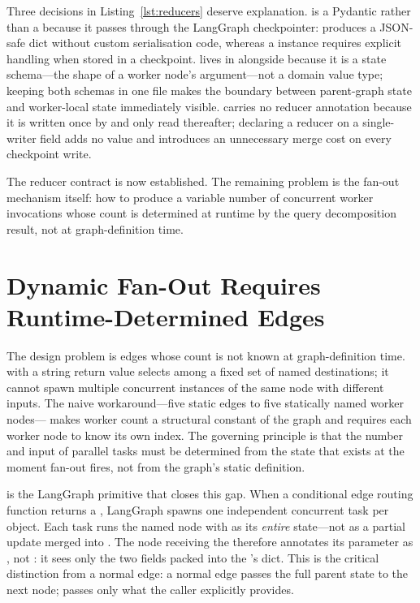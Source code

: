 Three decisions in Listing~\ref{lst:reducers} deserve explanation.
 is a Pydantic  rather than a
 because it passes through the LangGraph checkpointer:
 produces a JSON-safe dict without custom
serialisation code, whereas a  instance requires explicit
handling when stored in a checkpoint.  lives in
 alongside  because it is a state
schema---the shape of a worker node's  argument---not a
domain value type; keeping both schemas in one file makes the boundary
between parent-graph state and worker-local state immediately visible.
 carries no reducer annotation because it is written
once by  and only read thereafter; declaring a
reducer on a single-writer field adds no value and introduces an
unnecessary merge cost on every checkpoint write.

The reducer contract is now established. The remaining problem is the
fan-out mechanism itself: how to produce a variable number of concurrent
worker invocations whose count is determined at runtime by the query
decomposition result, not at graph-definition time.


\section{Dynamic Fan-Out Requires Runtime-Determined Edges}
\label{sec:send-fanout}

The design problem is edges whose count is not known at graph-definition
time.  with a string return value selects
among a fixed set of named destinations; it cannot spawn multiple
concurrent instances of the same node with different inputs. The naive
workaround---five static edges to five statically named worker nodes---
makes worker count a structural constant of the graph and requires each
worker node to know its own index. The governing principle is that the
number and input of parallel tasks must be determined from the state that
exists at the moment fan-out fires, not from the graph's static definition.

 is the LangGraph primitive that closes this gap.
When a conditional edge routing function returns a ,
LangGraph spawns one independent concurrent task per  object.
Each task runs the named node with  as its \emph{entire}
state---not as a partial update merged into . The node
receiving the  therefore annotates its  parameter
as , not : it sees only the two
fields packed into the 's  dict. This is the critical
distinction from a normal edge: a normal edge passes the full parent state
to the next node;  passes only what the caller explicitly
provides.

